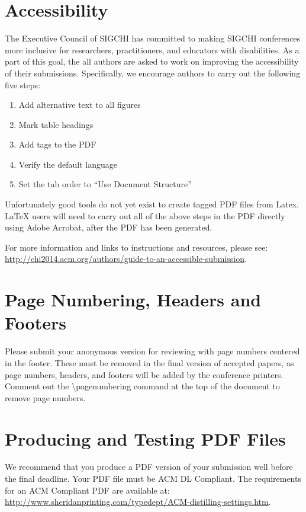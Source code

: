 \documentclass{sigchi}
\begin{document}
\section{Accessibility}
The Executive Council of SIGCHI has committed to making SIGCHI conferences more inclusive for researchers, practitioners, and educators with disabilities. As a part of this goal, the all authors are asked to work on improving the accessibility of their submissions. Specifically, we encourage authors to carry out the following five steps:
\begin{enumerate}
	\item Add alternative text to all figures
	\item Mark table headings
	\item Add tags to the PDF
	\item Verify the default language
	\item Set the tab order to ``Use Document Structure''
\end{enumerate}
Unfortunately good tools do not yet exist to create tagged PDF files from Latex. LaTeX users will need to carry out all of the above steps in the PDF directly using Adobe Acrobat, after the PDF has been generated.
 
For more information and links to instructions and resources, please see:
{\url{http://chi2014.acm.org/authors/guide-to-an-accessible-submission}}.

\section{Page Numbering, Headers and Footers}

Please submit your anonymous version for reviewing with page numbers
centered in the footer.  These must be removed in the final version of
accepted papers, as page numbers, headers, and footers will be added
by the conference printers.  Comment out the {\textbackslash}pagenumbering
command at the top of the document to remove page numbers.

\section{Producing and Testing PDF Files}

We recommend that you produce a PDF version of your submission well
before the final deadline.  Your PDF file must be ACM DL
Compliant. The requirements for an ACM Compliant PDF are available at:
{\url{http://www.sheridanprinting.com/typedept/ACM-distilling-settings.htm}}.
\end{document}
